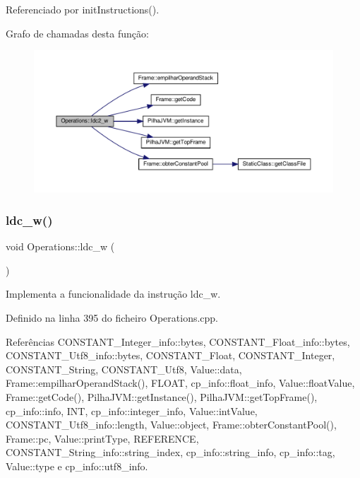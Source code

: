 Referenciado por init\+Instructions().

Grafo de chamadas desta função\+:
\nopagebreak
\begin{figure}[H]
\begin{center}
\leavevmode
\includegraphics[width=350pt]{classOperations_ae5f11d6a8ea22b30f316c47af914f05a_cgraph}
\end{center}
\end{figure}
\mbox{\label{classOperations_a081fd22827f77e8ce5219275256cc831}} 
\subsubsection{\texorpdfstring{ldc\+\_\+w()}{ldc\_w()}}
{\footnotesize\ttfamily void Operations\+::ldc\+\_\+w (\begin{DoxyParamCaption}{ }\end{DoxyParamCaption})\hspace{0.3cm}{\ttfamily [private]}}



Implementa a funcionalidade da instrução ldc\+\_\+w. 



Definido na linha 395 do ficheiro Operations.\+cpp.



Referências C\+O\+N\+S\+T\+A\+N\+T\+\_\+\+Integer\+\_\+info\+::bytes, C\+O\+N\+S\+T\+A\+N\+T\+\_\+\+Float\+\_\+info\+::bytes, C\+O\+N\+S\+T\+A\+N\+T\+\_\+\+Utf8\+\_\+info\+::bytes, C\+O\+N\+S\+T\+A\+N\+T\+\_\+\+Float, C\+O\+N\+S\+T\+A\+N\+T\+\_\+\+Integer, C\+O\+N\+S\+T\+A\+N\+T\+\_\+\+String, C\+O\+N\+S\+T\+A\+N\+T\+\_\+\+Utf8, Value\+::data, Frame\+::empilhar\+Operand\+Stack(), F\+L\+O\+AT, cp\+\_\+info\+::float\+\_\+info, Value\+::float\+Value, Frame\+::get\+Code(), Pilha\+J\+V\+M\+::get\+Instance(), Pilha\+J\+V\+M\+::get\+Top\+Frame(), cp\+\_\+info\+::info, I\+NT, cp\+\_\+info\+::integer\+\_\+info, Value\+::int\+Value, C\+O\+N\+S\+T\+A\+N\+T\+\_\+\+Utf8\+\_\+info\+::length, Value\+::object, Frame\+::obter\+Constant\+Pool(), Frame\+::pc, Value\+::print\+Type, R\+E\+F\+E\+R\+E\+N\+CE, C\+O\+N\+S\+T\+A\+N\+T\+\_\+\+String\+\_\+info\+::string\+\_\+index, cp\+\_\+info\+::string\+\_\+info, cp\+\_\+info\+::tag, Value\+::type e cp\+\_\+info\+::utf8\+\_\+info.



